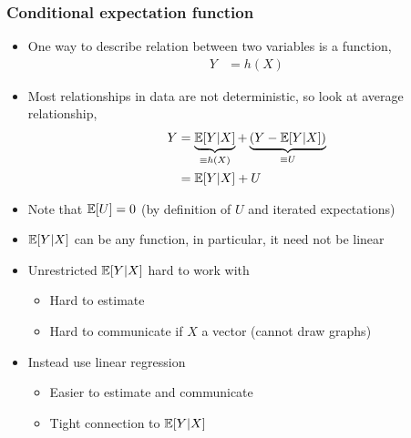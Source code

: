 \begin{frame}[allowframebreaks]
  \frametitle{Conditional expectation function}
  \begin{itemize}
  \item One way to describe relation between two variables is a
    function, 
    \begin{align*} 
Y &= h(X) 
\end{align*}
  \item Most relationships in data are not deterministic, so look at
    average relationship,
    \begin{align*}
      Y &=  \underbrace{\mathbb{E}[Y|X]}_{\equiv h(X)} + \underbrace{\left(Y
          - \mathbb{E}[Y|X]\right)}_{\equiv U}  \\  
      &= \mathbb{E}[Y|X] + U
    \end{align*}
  \item Note that $\mathbb{E}[U] = 0$ (by definition of $U$ and
    iterated expectations)
  \item $\mathbb{E}[Y|X]$ can be any function, in particular, it need not be
    linear
  \item Unrestricted $\mathbb{E}[Y|X]$ hard to work with
    \begin{itemize} 
    \item Hard to estimate
    \item Hard to communicate if $X$ a vector (cannot draw graphs) 
    \end{itemize}
  \item Instead use linear regression
    \begin{itemize}
    \item Easier to estimate and communicate
    \item Tight connection to $\mathbb{E}[Y|X]$
    \end{itemize}
  \end{itemize}
\end{frame}  


